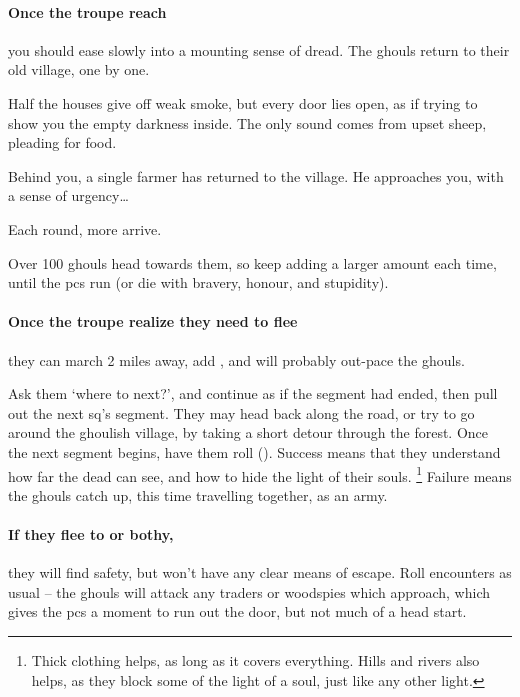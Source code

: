 \paragraph{Once the troupe reach }
you should ease slowly into a mounting sense of dread.
The ghouls return to their old \gls{village}, one by one.

\begin{boxtext}
  Half the houses give off weak smoke, but every door lies open, as if trying to show you the empty darkness inside.
  The only sound comes from upset sheep, pleading for food.

  Behind you, a single farmer has returned to the \gls{village}.
  He approaches you, with a sense of urgency\ldots
\end{boxtext}


Each round, more arrive.



Over 100 ghouls head towards them, so keep adding a larger amount each time, until the \glspl{pc} run (or die with bravery, honour, and stupidity).

\paragraph{Once the troupe realize they need to flee}
they can march 2 miles away, add , and will probably out-pace the ghouls.

Ask them `where to next?', and continue as if the \gls{segment} had ended, then pull out the next \gls{sq}'s \gls{segment}.
They may head back along the road, or try to go around the ghoulish \gls{village}, by taking a short detour through the forest.
Once the next \gls{segment} begins, have them roll  (\tn[12]).
Success means that they understand how far the dead can see, and how to hide the light of their souls.%
\footnote{Thick clothing helps, as long as it covers everything. Hills and rivers also helps, as they block some of the light of a soul, just like any other light.}
Failure means the ghouls catch up, this time travelling together, as an army.

\paragraph{If they flee to  or \gls{bothy},}
they will find safety, but won't have any clear means of escape.
Roll encounters as usual -- the ghouls will attack any traders or woodspies which approach, which gives the \glspl{pc} a moment to run out the door, but not much of a head start.

